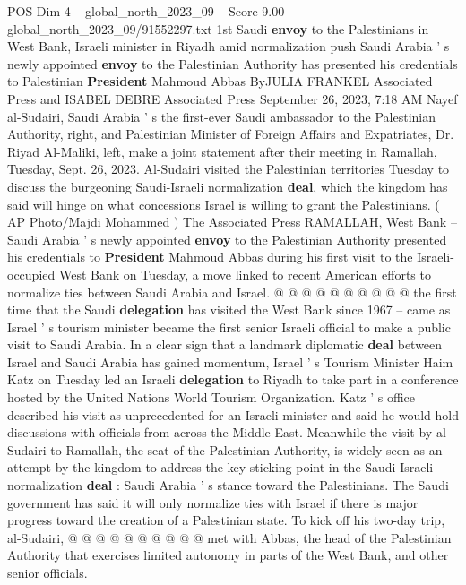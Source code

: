 \begin{textsample}{POS Dim 4 – global\_north\_2023\_09 – Score 9.00 – global\_north\_2023\_09/91552297.txt}  \label{ex:f4_pos_412}
1st Saudi \textbf{envoy} to the Palestinians in West Bank, Israeli minister in Riyadh amid normalization push Saudi Arabia ' s newly appointed \textbf{envoy} to the Palestinian Authority has presented his credentials to Palestinian \textbf{President} Mahmoud Abbas ByJULIA FRANKEL Associated Press and ISABEL DEBRE Associated Press September 26, 2023, 7:18 AM Nayef al-Sudairi, Saudi Arabia ' s the first-ever Saudi ambassador to the Palestinian Authority, right, and Palestinian Minister of Foreign Affairs and Expatriates, Dr.
Riyad Al-Maliki, left, make a joint statement after their meeting in Ramallah, Tuesday, Sept. 26, 2023.
Al-Sudairi visited the Palestinian territories Tuesday to discuss the burgeoning Saudi-Israeli normalization \textbf{deal}, which the kingdom has said will hinge on what concessions Israel is willing to grant the Palestinians. ( AP Photo/Majdi Mohammed ) The Associated Press RAMALLAH, West Bank -- Saudi Arabia ' s newly appointed \textbf{envoy} to the Palestinian Authority presented his credentials to \textbf{President} Mahmoud Abbas during his first visit to the Israeli-occupied West Bank on Tuesday, a move linked to recent American efforts to normalize ties between Saudi Arabia and Israel. @ @ @ @ @ @ @ @ @ @ the first time that the Saudi \textbf{delegation} has visited the West Bank since 1967 -- came as Israel ' s tourism minister became the first senior Israeli official to make a public visit to Saudi Arabia.
In a clear sign that a landmark diplomatic \textbf{deal} between Israel and Saudi Arabia has gained momentum, Israel ' s Tourism Minister Haim Katz on Tuesday led an Israeli \textbf{delegation} to Riyadh to take part in a conference hosted by the United Nations World Tourism Organization.
Katz ' s office described his visit as unprecedented for an Israeli minister and said he would hold discussions with officials from across the Middle East.
Meanwhile the visit by al-Sudairi to Ramallah, the seat of the Palestinian Authority, is widely seen as an attempt by the kingdom to address the key sticking point in the Saudi-Israeli normalization \textbf{deal} : Saudi Arabia ' s stance toward the Palestinians.
The Saudi government has said it will only normalize ties with Israel if there is major progress toward the creation of a Palestinian state.
To kick off his two-day trip, al-Sudairi, @ @ @ @ @ @ @ @ @ @ met with Abbas, the head of the Palestinian Authority that exercises limited autonomy in parts of the West Bank, and other senior officials.

\end{textsample}
